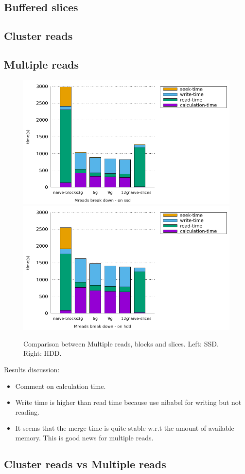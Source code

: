 \documentclass[10pt, conference, compsocconf]{IEEEtran}
\begin{document}
\subsection{Buffered slices}

\subsection{Cluster reads}

\subsection{Multiple reads}

\begin{figure}[h]
  \centering
  \includegraphics[width=0.45\columnwidth]{figures/benchmark-mreads/mreads-breakdown-ssd.pdf}
  \hfill
    \includegraphics[width=0.45\columnwidth]{figures/benchmark-mreads/mreads-breakdown-hdd.pdf}
  \caption{Comparison between Multiple reads, blocks and slices. Left: SSD. Right: HDD.}
\label{fig:multiple-reads}
\end{figure}

Results discussion:
\begin{itemize}
\item Comment on calculation time.
\item Write time is higher than read time because use nibabel for writing but not reading.
\item It seems that the merge time is quite stable w.r.t the amount of available memory. This is good news for multiple reads. 
\end{itemize}

\subsection{Cluster reads vs Multiple reads}
\end{document}
